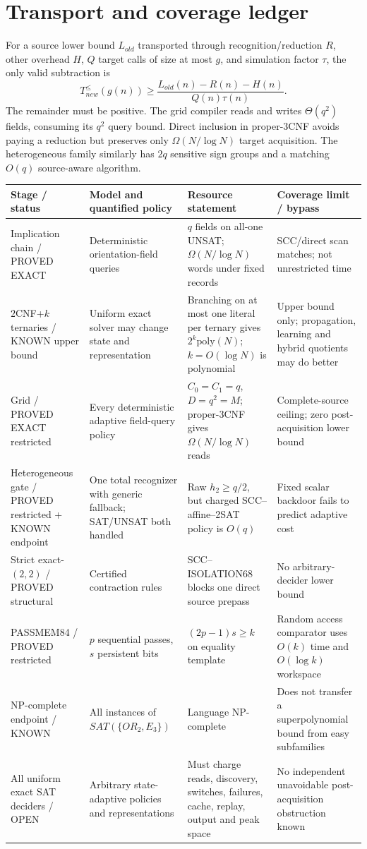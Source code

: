 \documentclass[11pt]{article}
\begin{document}
\section{Transport and coverage ledger}
For a source lower bound $L_{old}$ transported through recognition/reduction
$R$, other overhead $H$, $Q$ target calls of size at most $g$, and simulation
factor $\tau$, the only valid subtraction is
\[
T_{new}^{\le}(g(n))\ge
\frac{L_{old}(n)-R(n)-H(n)}{Q(n)\tau(n)}.
\tag{9}
\]
The remainder must be positive.  The grid compiler reads and writes
$\Theta(q^2)$ fields, consuming its $q^2$ query bound.  Direct inclusion in
proper-3CNF avoids paying a reduction but preserves only
$\Omega(N/\log N)$ target acquisition.  The heterogeneous family similarly
has $2q$ sensitive sign groups and a matching $O(q)$ source-aware algorithm.

\footnotesize\renewcommand{\arraystretch}{1.08}
\begin{longtable}{p{.16\linewidth}p{.19\linewidth}p{.27\linewidth}p{.26\linewidth}}
\toprule
Stage / status & Model and quantified policy & Resource statement & Coverage limit / bypass\\\midrule\endhead
Implication chain / PROVED EXACT & Deterministic orientation-field queries & $q$ fields on all-one UNSAT; $\Omega(N/\log N)$ words under fixed records & SCC/direct scan matches; not unrestricted time\\
$2$CNF+$k$ ternaries / KNOWN upper bound & Uniform exact solver may change state and representation & Branching on at most one literal per ternary gives $2^k\mathrm{poly}(N)$; $k=O(\log N)$ is polynomial & Upper bound only; propagation, learning and hybrid quotients may do better\\
Grid / PROVED EXACT restricted & Every deterministic adaptive field-query policy & $C_0=C_1=q$, $D=q^2=M$; proper-3CNF gives $\Omega(N/\log N)$ reads & Complete-source ceiling; zero post-acquisition lower bound\\
Heterogeneous gate / PROVED restricted + KNOWN endpoint & One total recognizer with generic fallback; SAT/UNSAT both handled & Raw $h_2\ge q/2$, but charged SCC--affine--2SAT policy is $O(q)$ & Fixed scalar backdoor fails to predict adaptive cost\\
Strict exact-$(2,2)$ / PROVED structural & Certified contraction rules & SCC--ISOLATION68 blocks one direct source prepass & No arbitrary-decider lower bound\\
PASSMEM84 / PROVED restricted & $p$ sequential passes, $s$ persistent bits & $(2p-1)s\ge k$ on equality template & Random access comparator uses $O(k)$ time and $O(\log k)$ workspace\\
NP-complete endpoint / KNOWN & All instances of $SAT(\{OR_2,E_3\})$ & Language NP-complete & Does not transfer a superpolynomial bound from easy subfamilies\\
All uniform exact SAT deciders / OPEN & Arbitrary state-adaptive policies and representations & Must charge reads, discovery, switches, failures, cache, replay, output and peak space & No independent unavoidable post-acquisition obstruction known\\\bottomrule
\end{longtable}\normalsize
\end{document}
